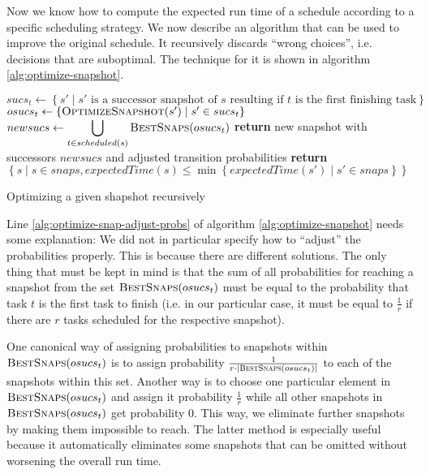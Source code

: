 Now we know how to compute the expected run time of a schedule according to a specific scheduling strategy. We now describe an algorithm that can be used to improve the original schedule. It recursively discards ``wrong choices'', i.e. decisions that are suboptimal. The technique for it is shown in algorithm \ref{alg:optimize-snapshot}.

\begin{algorithm}[t]
  \begin{algorithmic}[5]
    \State $sucs_t \gets \left\{ s' \mid s' \text{ is a successor snapshot of } s \text{ resulting if } t \text{ is the first finishing task} \right\}$
    \State $osucs_t \gets \left\{ \Call{OptimizeSnapshot}{s'} \mid s' \in sucs_t \right\}$
    \EndFor
    \State $\displaystyle newsucs \gets \bigcup_{t\in scheduled(s)}  \Call{BestSnaps}{osucs_t} $
    \State \textbf{return} new snapshot with successors $newsucs$ and adjusted transition probabilities
    \label{alg:optimize-snap-adjust-probs}
    \EndProcedure
    \Statex
      \State \textbf{return} $\left\{ s \mid s\in snaps, expectedTime(s) \leq \min\left\{ expectedTime(s')\mid s' \in snaps \right\} \right\}$
    \EndProcedure
  \end{algorithmic}
  \caption{Optimizing a given shapshot recursively}
  \label{alg:optimize-snapshot}
\end{algorithm}

Line \ref{alg:optimize-snap-adjust-probs} of algorithm \ref{alg:optimize-snapshot} needs some explanation: We did not in particular specify how to ``adjust'' the probabilities properly. This is because there are different solutions. The only thing that must be kept in mind is that the sum of all probabilities for reaching a snapshot from the set $\Call{BestSnaps}{osucs_t}$ must be equal to the probability that task $t$ is the first task to finish (i.e. in our particular case, it must be equal to $\frac{1}{r}$ if there are $r$ tasks scheduled for the respective snapshot).

One canonical way of assigning probabilities to snapshots within $\Call{BestSnaps}{osucs_t}$ is to assign probability $\frac{1}{r\cdot|\Call{BestSnaps}{osucs_t}|}$ to each of the snapshots within this set. Another way is to choose one particular element in $\Call{BestSnaps}{osucs_t}$ and assign it probability $\frac{1}{r}$ while all other snapshots in $\Call{BestSnaps}{osucs_t}$ get probability 0. This way, we eliminate further snapshots by making them impossible to reach. The latter method is especially useful because it automatically eliminates some snapshots that can be omitted without worsening the overall run time.

